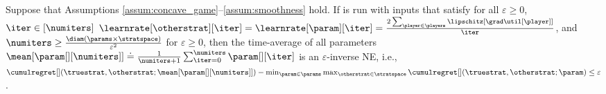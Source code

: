 % 
\begin{reptheorem}[\ref{thm:concave_game_inverse_NE}]
    Suppose that Assumptions \ref{assum:concave_game}--\ref{assum:smoothness} hold. 
    If  is run with inputs that satisfy for all $\varepsilon \geq 0$, $\iter \in [\numiters]$ $\learnrate[\otherstrat][\iter] = \learnrate[\param][\iter] = \frac{2\sum_{\player \in \players} \lipschitz[{\grad \util[\player]}]}{\iter}$, and $\numiters \geq \frac{\diam(\params \times \stratspace)}{\varepsilon^2}$ for $\varepsilon \geq 0$, then the time-average of all parameters $\mean[{\param[][\numiters]}] \doteq \frac{1}{\numiters + 1}\sum_{\iter = 0}^\numiters \param[][\iter]$ is an $\varepsilon$-inverse NE, i.e., $\cumulregret[] (\truestrat, \otherstrat; \mean[{\param[][\numiters]}]) - \min_{\substack{\param \in \params}} \max_{\otherstrat \in \stratspace} \cumulregret[] (\truestrat, \otherstrat; \param) \leq \varepsilon$.
\end{reptheorem}



